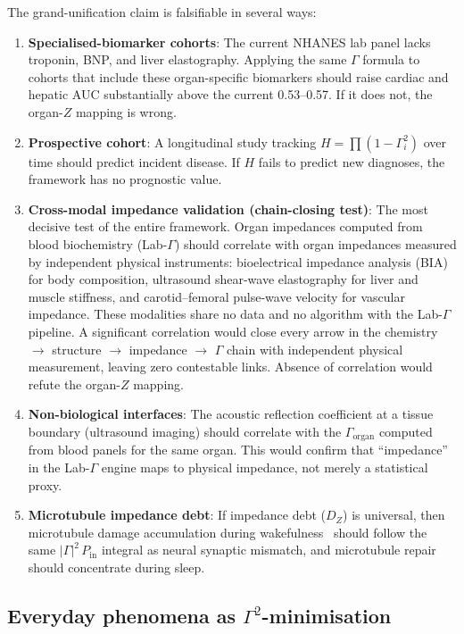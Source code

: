 \documentclass[aps,pre,twocolumn,superscriptaddress,floatfix]{revtex4-2}
\begin{document}
The grand-unification claim is falsifiable in several ways:
\begin{enumerate}
  \item \textbf{Specialised-biomarker cohorts}: The current
    NHANES lab panel lacks troponin, BNP, and liver
    elastography.  Applying the same $\Gamma$ formula to
    cohorts that include these organ-specific biomarkers
    should raise cardiac and hepatic AUC substantially
    above the current 0.53--0.57.  If it does not, the
    organ-$Z$ mapping is wrong.
  \item \textbf{Prospective cohort}: A longitudinal study
    tracking $H=\prod(1-\Gamma_i^2)$ over time should
    predict incident disease.  If $H$ fails to predict
    new diagnoses, the framework has no prognostic value.
  \item \textbf{Cross-modal impedance validation
    (chain-closing test)}:
    The most decisive test of the entire framework.
    Organ impedances computed from blood biochemistry
    (Lab-$\Gamma$) should correlate with organ impedances
    measured by independent physical instruments:
    bioelectrical impedance analysis (BIA) for body
    composition, ultrasound shear-wave elastography for
    liver and muscle stiffness, and carotid--femoral
    pulse-wave velocity for vascular impedance.
    These modalities share no data and no algorithm with
    the Lab-$\Gamma$ pipeline.
    A significant correlation would close every arrow in
    the chemistry $\to$ structure $\to$ impedance $\to$
    $\Gamma$ chain with independent physical measurement,
    leaving zero contestable links.
    Absence of correlation would refute the organ-$Z$
    mapping.
  \item \textbf{Non-biological interfaces}: The acoustic
    reflection coefficient at a tissue boundary
    (ultrasound imaging) should correlate with the
    $\Gamma_{\text{organ}}$ computed from blood panels
    for the same organ.  This would confirm that
    ``impedance'' in the Lab-$\Gamma$ engine maps to
    physical impedance, not merely a statistical proxy.
  \item \textbf{Microtubule impedance debt}: If impedance
    debt ($D_Z$) is universal, then microtubule damage
    accumulation during wakefulness~\cite{Kalra2025}
    should follow the same $|\Gamma|^2\,P_{\text{in}}$
    integral as neural synaptic mismatch, and microtubule
    repair should concentrate during sleep.
\end{enumerate}


\subsection{Everyday phenomena as $\Gamma^2$-minimisation}
\label{sec:everyday-gamma}
\end{document}

